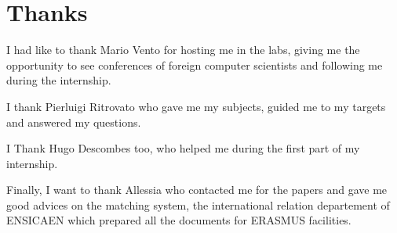 \chapter*{Thanks}
\par I had like to thank Mario Vento for hosting me in the labs, giving me the opportunity to see conferences of foreign computer scientists and following me during the internship.	
\par I thank Pierluigi Ritrovato who gave me my subjects, guided me to my targets and answered my questions.
\par I Thank Hugo Descombes too, who helped me during the first part of my internship. 
\par Finally, I want to thank Allessia who contacted me for the papers and gave me good advices on the matching system, the international relation departement of ENSICAEN which prepared all the documents for ERASMUS facilities.